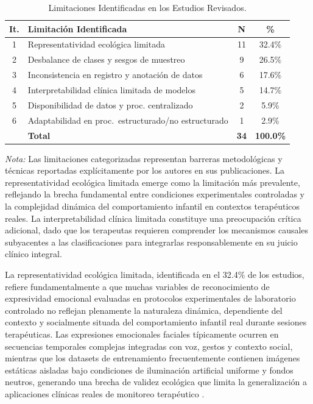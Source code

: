 \documentclass[3p,twocolumn,times]{elsarticle}
\begin{document}
	\begin{table}[!ht]
		\centering
		\caption{Limitaciones Identificadas en los Estudios Revisados.}\label{tab13}
		\begin{tabular}{cp{3.5cm}cc}
			\toprule
			\textbf{It.} & \textbf{Limitación Identificada} & \textbf{N} & \textbf{\%} \\
			\midrule
			1 & Representatividad ecológica limitada                         & 11 & 32.4\% \\
			2 & Desbalance de clases y sesgos de muestreo                    & 9  & 26.5\% \\
			3 & Inconsistencia en registro y anotación de datos              & 6  & 17.6\% \\
			4 & Interpretabilidad clínica limitada de modelos                & 5  & 14.7\% \\
			5 & Disponibilidad de datos y proc. centralizado                 & 2  & 5.9\%  \\
			6 & Adaptabilidad en proc.\ estructurado/no estructurado         & 1 & 2.9\%  \\
			& \textbf{Total}                                               & \textbf{34} & \textbf{100.0\%} \\
			\bottomrule
		\end{tabular}
		\begin{minipage}{\columnwidth}
			\vspace{6pt}
			\small\textit{Nota:} Las limitaciones categorizadas representan barreras
			metodológicas y técnicas reportadas explícitamente por los autores en sus
			publicaciones. La representatividad ecológica limitada emerge como la limitación
			más prevalente, reflejando la brecha fundamental entre condiciones experimentales
			controladas y la complejidad dinámica del comportamiento infantil en contextos
			terapéuticos reales. La interpretabilidad clínica limitada constituye una
			preocupación crítica adicional, dado que los terapeutas requieren comprender los
			mecanismos causales subyacentes a las clasificaciones para integrarlas
			responsablemente en su juicio clínico integral.
		\end{minipage}
	\end{table}
	
	La representatividad ecológica limitada, identificada en el 32.4\% de los estudios,
	refiere fundamentalmente a que muchas variables de reconocimiento de expresividad
	emocional evaluadas en protocolos experimentales de laboratorio controlado no
	reflejan plenamente la naturaleza dinámica, dependiente del contexto y socialmente
	situada del comportamiento infantil real durante sesiones terapéuticas. Las
	expresiones emocionales faciales típicamente ocurren en secuencias temporales
	complejas integradas con voz, gestos y contexto social, mientras que los datasets
	de entrenamiento frecuentemente contienen imágenes estáticas aisladas bajo
	condiciones de iluminación artificial uniforme y fondos neutros, generando una
	brecha de validez ecológica que limita la generalización a aplicaciones clínicas
	reales de monitoreo terapéutico \cite{Johnson2025,Radocaj2025}.
	
\end{document}
